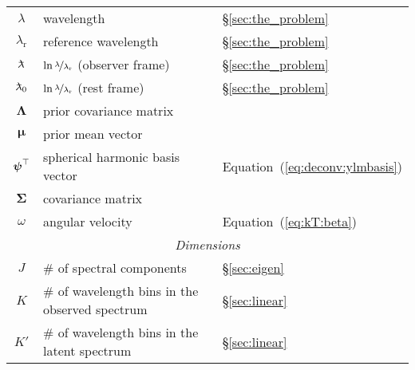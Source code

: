 \documentclass[modern]{aastex62}
\begin{document}
\begin{center}
\begin{longtable}{cll}
        $\lambda$                                           & wavelength                                                   & \S\ref{sec:the_problem}                    \\
        $\lambda_\mathrm{r}$                                & reference wavelength                                         & \S\ref{sec:the_problem}                    \\
        $\lnlam$                                            & $\ln\nicefrac{\lambda}{\lambda_\mathrm{r}}$ (observer frame) & \S\ref{sec:the_problem}                    \\
        $\lnlam_0$                                          & $\ln\nicefrac{\lambda}{\lambda_\mathrm{r}}$ (rest frame)     & \S\ref{sec:the_problem}                    \\
        $\boldsymbol{\Lambda}$                              & prior covariance matrix                                      &                                            \\
        $\boldsymbol{\mu}$                                  & prior mean vector                                            &                                            \\
        $\boldsymbol{\psi}^\top$                                         & spherical harmonic basis vector                              & Equation~(\ref{eq:deconv:ylmbasis})        \\
        $\boldsymbol{\Sigma}$                               & covariance matrix                                            &                                            \\
        $\omega$                                            & angular velocity                                             & Equation~(\ref{eq:kT:beta})                \\
        \midrule
        \multicolumn{3}{c}{\emph{Dimensions}}                                                                                                                           \\
        \midrule
        $J$                                                 & \# of spectral components                                    & \S\ref{sec:eigen}                          \\
        $K$                                                 & \# of wavelength bins in the observed spectrum               & \S\ref{sec:linear}                         \\
        $K'$                                                & \# of wavelength bins in the latent spectrum                 & \S\ref{sec:linear}                         \\

\end{longtable}
\end{center}
\end{document}
